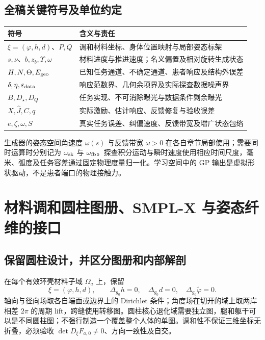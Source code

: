 \documentclass[11pt,a4paper]{article}
\numberwithin{equation}{section}
\theoremstyle{definition}
\begin{document}
\subsection{全稿关键符号及单位约定}
\begin{center}\small
\begin{tabularx}{\linewidth}{lY}
\toprule
符号 & 含义与责任\\
\midrule
$\xi=(\varphi,h,d)$、$P,Q$ & 调和材料坐标、身体位置映射与局部姿态标架\\
$s,\nu$、$b,z_b,\Upsilon,\omega$ & 材料进度与推进速度；名义偏置及相对旋转生成状态\\
$H,N,\Theta,E_{\rm geo}$ & 已知任务通道、不确定通道、患者响应及结构外误差\\
$\delta,\eta,\varepsilon_{\rm data}$ & 响应范数界、几何余项界及实际探查数据噪声界\\
$B,D_\star,D_Q$ & 任务实现、不可消除曝光与数据条件剩余曝光\\
$X,\widehat J,C,q$ & 实际激励、估计响应、反馈修复与验收误差\\
$e,\zeta,\omega,S$ & 真实任务误差、纠偏速度、反馈带宽及增广状态包络\\
\bottomrule
\end{tabularx}\end{center}
生成器的姿态空间角速度 $\omega(s)$ 与反馈带宽 $\omega>0$ 在各自章节局部使用；需要同时运算时分别记为 $\omega_{\rm sk}$ 与 $\omega_{\rm fb}$。探查积分运动与瞬时速度使用相应时间尺度，毫米、弧度及任务容差通过固定物理度量归一化。学习空间中的 GP 输出是虚拟形状驱动，不是患者端口的物理接触力。

\section{材料调和圆柱图册、SMPL-X 与姿态纤维的接口}
\subsection{保留圆柱设计，并区分图册和内部解剖}
在每个有效环壳材料子域 $\Omega_a$ 上，保留
\begin{equation}
 \xi=(\varphi,h,d),\qquad
 \Delta_{g_0}h=0,\quad \Delta_{g_0}d=0,\quad
 \Delta_{g_0}\widetilde\varphi=0.
\end{equation}
轴向与径向场取各自端面或边界上的 Dirichlet 条件；角度场在切开的域上取两岸相差 $2\pi$ 的周期 lift，跨缝使用转移图。圆柱核心退化域需要独立图，腿和躯干可以是不同圆柱图；不强行制造一个覆盖整个人体的单图。调和性不保证三维坐标无折叠，必须验收 $\det D_\xi F_{a,0}\ne0$、方向一致性及自交。
\end{document}

